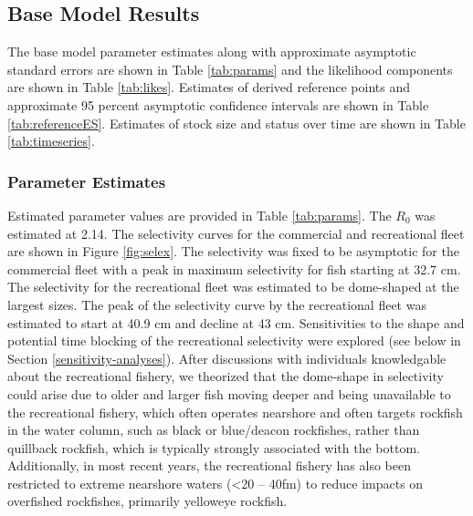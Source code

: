 \documentclass[11pt,
  english,
  a4paper,
]{article}
\begin{document}

\hypertarget{base-model-results}{%
\subsection{Base Model Results}\label{base-model-results}}

\leavevmode\tagmcend\tagstructend


The base model parameter estimates along with approximate asymptotic standard errors are shown in Table \ref{tab:params} and the likelihood components are shown in Table \ref{tab:likes}. Estimates of derived reference points and approximate 95 percent asymptotic confidence intervals are shown in Table \ref{tab:referenceES}. Estimates of stock size and status over time are shown in Table \ref{tab:timeseries}.

\leavevmode\tagmcend\tagstructend\par


\hypertarget{parameter-estimates}{%
\subsubsection{Parameter Estimates}\label{parameter-estimates}}

\leavevmode\tagmcend\tagstructend


Estimated parameter values are provided in Table \ref{tab:params}. The {\(R_0\)\leavevmode\tagmcend\tagstructend} was estimated at 2.14. The selectivity curves for the commercial and recreational fleet are shown in Figure \ref{fig:selex}. The selectivity was fixed to be asymptotic for the commercial fleet with a peak in maximum selectivity for fish starting at 32.7 cm. The selectivity for the recreational fleet was estimated to be dome-shaped at the largest sizes. The peak of the selectivity curve by the recreational fleet was estimated to start at 40.9 cm and decline at 43 cm. Sensitivities to the shape and potential time blocking of the recreational selectivity were explored (see below in Section \ref{sensitivity-analyses}). After discussions with individuals knowledgable about the recreational fishery, we theorized that the dome-shape in selectivity could arise due to older and larger fish moving deeper and being unavailable to the recreational fishery, which often operates nearshore and often targets rockfish in the water column, such as black or blue/deacon rockfishes, rather than quillback rockfish, which is typically strongly associated with the bottom. Additionally, in most recent years, the recreational fishery has also been restricted to extreme nearshore waters (\textless20 -- 40fm) to reduce impacts on overfished rockfishes, primarily yelloweye rockfish.
\end{document}
